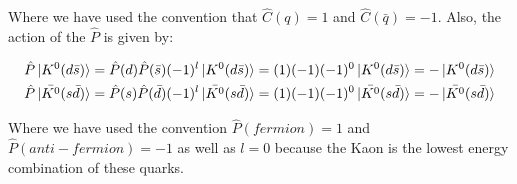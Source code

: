\noindent Where we have used the convention that $\hat{C} (q) = 1$ and $\hat{C} (\bar{q}) = -1$. Also, the action of the $\hat{P}$ is given by:
    
\begin{align*}
\hat{P} \ket{K^{0}(d \bar{s})} = \hat{P}(d) \hat{P}(\bar{s})(-1)^{l} \ket{K^{0}(d \bar{s})} = (1)(-1)(-1)^0 \ket{K^{0}(d \bar{s})} = - \ket{K^{0}(d \bar{s})} \\
\hat{P} \ket{\bar{K^{0}}(s \bar{d})} = \hat{P}(s) \hat{P}(\bar{d})(-1)^{l} \ket{\bar{K^{0}}(s \bar{d})} = (1)(-1)(-1)^0 \ket{\bar{K^{0}}(s \bar{d})} = - \ket{\bar{K^{0}}(s \bar{d})} 
\end{align*}

\noindent Where we have used the convention $\hat{P} (fermion) = 1$ and $\hat{P} (anti-fermion) = -1$ as well as $l=0$ because the Kaon is the lowest energy combination of these quarks.

